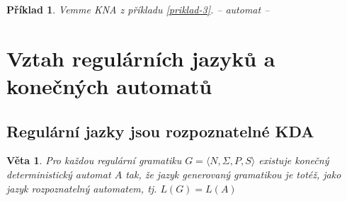 \documentclass[10pt, a4paper, titlepage]{article}
\theoremstyle{note}
\newtheorem{veta}{\textbf{Věta}}
\newtheorem{priklad}{\textbf{Příklad}}
\begin{document}
\begin{priklad}
Vemme KNA z příkladu \ref{priklad-3}.
 -- automat --
\end{priklad}


\section{Vztah regulárních jazyků a konečných automatů}

\subsection{Regulární jazky jsou rozpoznatelné KDA}

\begin{veta}
Pro každou regulární gramatiku $G=\langle N,\Sigma,P,S \rangle$ existuje konečný deterministický automat $A$ tak, že jazyk generovaný gramatikou je totéž, jako jazyk rozpoznatelný automatem, tj. $ L(G)=L(A)$
\end{veta} 
\end{document}
